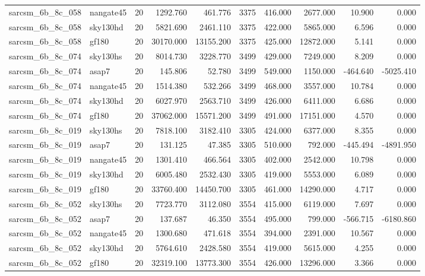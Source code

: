 \begin{longtable}{llrrrrrrrr}
sarcsm\_6b\_8c\_058 & nangate45 & 20 & 1292.760 & 461.776 & 3375 & 416.000 & 2677.000 & 10.900 & 0.000 \\
sarcsm\_6b\_8c\_058 & sky130hd & 20 & 5821.690 & 2461.110 & 3375 & 422.000 & 5865.000 & 6.596 & 0.000 \\
sarcsm\_6b\_8c\_058 & gf180 & 20 & 30170.000 & 13155.200 & 3375 & 425.000 & 12872.000 & 5.141 & 0.000 \\
sarcsm\_6b\_8c\_074 & sky130hs & 20 & 8014.730 & 3228.770 & 3499 & 429.000 & 7249.000 & 8.209 & 0.000 \\
sarcsm\_6b\_8c\_074 & asap7 & 20 & 145.806 & 52.780 & 3499 & 549.000 & 1150.000 & -464.640 & -5025.410 \\
sarcsm\_6b\_8c\_074 & nangate45 & 20 & 1514.380 & 532.266 & 3499 & 468.000 & 3557.000 & 10.784 & 0.000 \\
sarcsm\_6b\_8c\_074 & sky130hd & 20 & 6027.970 & 2563.710 & 3499 & 426.000 & 6411.000 & 6.686 & 0.000 \\
sarcsm\_6b\_8c\_074 & gf180 & 20 & 37062.000 & 15571.200 & 3499 & 491.000 & 17151.000 & 4.570 & 0.000 \\
sarcsm\_6b\_8c\_019 & sky130hs & 20 & 7818.100 & 3182.410 & 3305 & 424.000 & 6377.000 & 8.355 & 0.000 \\
sarcsm\_6b\_8c\_019 & asap7 & 20 & 131.125 & 47.385 & 3305 & 510.000 & 792.000 & -445.494 & -4891.950 \\
sarcsm\_6b\_8c\_019 & nangate45 & 20 & 1301.410 & 466.564 & 3305 & 402.000 & 2542.000 & 10.798 & 0.000 \\
sarcsm\_6b\_8c\_019 & sky130hd & 20 & 6005.480 & 2532.430 & 3305 & 419.000 & 5553.000 & 6.089 & 0.000 \\
sarcsm\_6b\_8c\_019 & gf180 & 20 & 33760.400 & 14450.700 & 3305 & 461.000 & 14290.000 & 4.717 & 0.000 \\
sarcsm\_6b\_8c\_052 & sky130hs & 20 & 7723.770 & 3112.080 & 3554 & 415.000 & 6119.000 & 7.697 & 0.000 \\
sarcsm\_6b\_8c\_052 & asap7 & 20 & 137.687 & 46.350 & 3554 & 495.000 & 799.000 & -566.715 & -6180.860 \\
sarcsm\_6b\_8c\_052 & nangate45 & 20 & 1300.680 & 471.618 & 3554 & 394.000 & 2391.000 & 10.567 & 0.000 \\
sarcsm\_6b\_8c\_052 & sky130hd & 20 & 5764.610 & 2428.580 & 3554 & 419.000 & 5615.000 & 4.255 & 0.000 \\
sarcsm\_6b\_8c\_052 & gf180 & 20 & 32319.100 & 13773.300 & 3554 & 426.000 & 13296.000 & 3.366 & 0.000 \\

\end{longtable}
